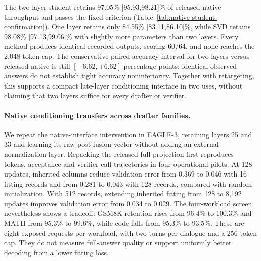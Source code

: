 \documentclass{article}
\begin{document}
The two-layer student retains 97.05\% [95.93,98.21]\% of released-native
throughput and passes the fixed criterion (Table~\ref{tab:native-student-confirmation}).
One layer retains only 84.55\% [83.11,86.10]\%, while SVD retains
98.08\% [97.13,99.06]\% with slightly more parameters than two layers.
Every method produces identical recorded outputs, scoring 60/64, and
none reaches the 2,048-token cap. The conservative paired accuracy
interval for two layers versus released native is still $[-6.62,+6.62]$
percentage points: identical observed answers do not establish tight
accuracy noninferiority. Together with retargeting, this supports a
compact late-layer conditioning interface in two uses, without claiming
that two layers suffice for every drafter or verifier.

\begin{table}[H]
\centering\small

\caption{Fixed native-student comparison on a separate set of 64 GSM8K
questions. Retention uses the released-native reference and 10,000
paired question bootstrap replicates, seed 1729. Only the two-layer
comparison is primary. Counts refer to the input projection, not the
whole drafter. Fitting-seed variation is outside these intervals.}
\label{tab:native-student-confirmation}
\end{table}

\paragraph{Native conditioning transfers across drafter families.}
We repeat the native-interface intervention in EAGLE-3, retaining layers
25 and 33 and learning its raw post-fusion vector without adding an
external normalization layer. Repacking the released full projection
first reproduces tokens, acceptance and verifier-call trajectories in
four operational pilots. At 128 updates, inherited columns reduce
validation error from 0.369 to 0.046 with 16 fitting records and from
0.281 to 0.043 with 128 records, compared with random initialization.
With 512 records, extending inherited fitting from 128 to 8,192 updates
improves validation error from 0.034 to 0.029. The four-workload screen
nevertheless shows a tradeoff: GSM8K retention rises from 96.4\% to
100.3\% and MATH from 95.3\% to 99.6\%, while code falls from 95.3\%
to 93.5\%. These are eight exposed requests per workload, with two
turns per dialogue and a 256-token cap. They do not measure full-answer
quality or support uniformly better decoding from a lower fitting loss.
\end{document}
